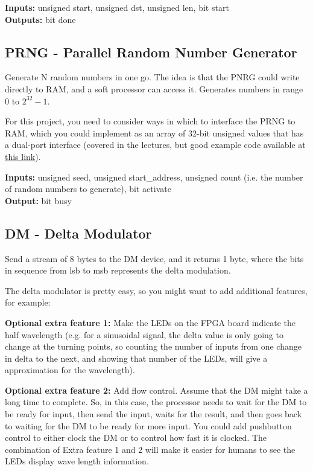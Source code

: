 
\textbf{Inputs:} unsigned start, unsigned dst, unsigned len, bit start\\
\textbf{Outputs:} bit done

\subsection{PRNG - Parallel Random Number Generator}
Generate N random numbers in one go. The idea is that the PNRG could write directly to RAM, and a soft processor can access it. Generates numbers in range 0 to $2^{32}-1$.

For this project, you need to consider ways in which to interface the PRNG to RAM, which you could implement as an array of 32-bit unsigned values that has a dual-port interface (covered in the lectures, but good example code available at \href{http://www.asic-world.com/examples/verilog/ram_dp_sr_sw.html}{this link}).

\textbf{Inputs:} unsigned seed, unsigned start\_address, unsigned count (i.e. the number of random numbers to generate), bit activate\\
\textbf{Output:} bit busy

\subsection{DM - Delta Modulator}
Send a stream of 8 bytes to the DM device, and it returns 1 byte, where the bits in sequence from lsb to msb represents the delta modulation.

The delta modulator is pretty easy, so you might want to add additional features, for example:

\textbf{Optional extra feature 1:} Make the LEDs on the FPGA board indicate the half wavelength (e.g. for a sinusoidal signal, the delta value is only going to change at the turning points, so counting the number of inputs from one change in delta to the next, and showing that number of the LEDs, will give a approximation for the wavelength).

\textbf{Optional extra feature 2:} Add flow control. Assume that the DM might take a long time to complete. So, in this case, the processor needs to wait for the DM to be ready for input, then send the input, waits for the result, and then goes back to waiting for the DM to be ready for more input. You could add pushbutton control to either clock the DM or to control how fast it is clocked. The combination of Extra feature 1 and 2 will make it easier for humans to see the LEDs display wave length information.

